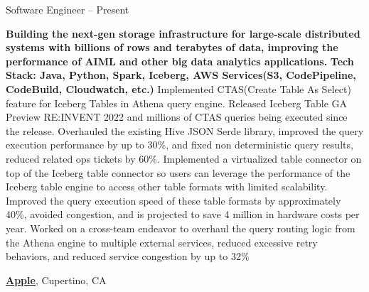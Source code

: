 \documentclass[a4paper,MMMyyyy,nonstopmode]{simpleresumecv}
\begin{document}
\begin{Body}
\Gap
\BulletItem
Software Engineer
\hfill
{} --
Present
\begin{Detail}
\SubBulletItem
\textbf{Building the next-gen storage infrastructure for large-scale distributed systems with billions of rows and terabytes of data, improving the performance of AIML and other big data analytics applications.}
\SubBulletItem \textbf{Tech Stack: Java, Python, Spark, Iceberg, AWS Services(S3, CodePipeline, CodeBuild, Cloudwatch, etc.)}
\SubBulletItem
Implemented CTAS(Create Table As Select) feature for Iceberg Tables in Athena query engine. Released Iceberg Table GA Preview RE:INVENT 2022 and millions of CTAS queries being executed since the release.
\SubBulletItem
Overhauled the existing Hive JSON Serde library, improved the query execution performance by up to 30\%, and fixed non deterministic query results, reduced related ops tickets by 60\%.
\SubBulletItem
Implemented a virtualized table connector on top of the Iceberg table connector so users can leverage the performance of the Iceberg table engine to access other table formats with limited scalability. 
Improved the query execution speed of these table formats by approximately 40\%, avoided congestion, and is projected to save 4 million in hardware costs per year.
\SubBulletItem
Worked on a cross-team endeavor to overhaul the query routing logic from the Athena engine to multiple external services, reduced excessive retry behaviors, and reduced service congestion by up to 32\%
\end{Detail}

\BigGap
\Entry
\href{https://www.apple.com/}
{\textbf{Apple}},
Cupertino, CA


\end{Body}
\end{document}

